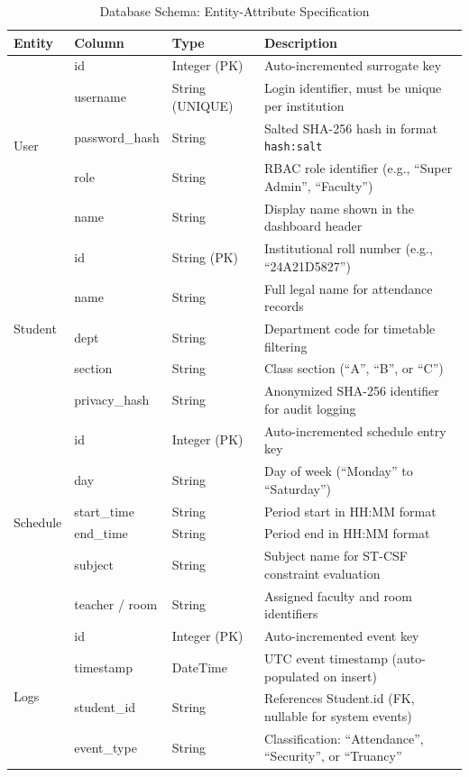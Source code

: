 \documentclass[12pt,a4paper,oneside]{report}
\begin{document}
\begin{table}[htbp]
\caption{Database Schema: Entity-Attribute Specification}
\centering
\small
{}
\setlength{\tabcolsep}{4pt}
\begin{tabular}{@{}l l l p{2.0in}@{}}
\hline
\textbf{Entity} & \textbf{Column} & \textbf{Type} & \textbf{Description} \\ \hline
\multirow{5}{*}{User} & id & Integer (PK) & Auto-incremented surrogate key \\
 & username & String (UNIQUE) & Login identifier, must be unique per institution \\
 & password\_hash & String & Salted SHA-256 hash in format \texttt{hash:salt} \\
 & role & String & RBAC role identifier (e.g., ``Super Admin'', ``Faculty'') \\
 & name & String & Display name shown in the dashboard header \\ \hline
\multirow{5}{*}{Student} & id & String (PK) & Institutional roll number (e.g., ``24A21D5827'') \\
 & name & String & Full legal name for attendance records \\
 & dept & String & Department code for timetable filtering \\
 & section & String & Class section (``A'', ``B'', or ``C'') \\
 & privacy\_hash & String & Anonymized SHA-256 identifier for audit logging \\ \hline
\multirow{6}{*}{Schedule} & id & Integer (PK) & Auto-incremented schedule entry key \\
 & day & String & Day of week (``Monday'' to ``Saturday'') \\
 & start\_time & String & Period start in HH:MM format \\
 & end\_time & String & Period end in HH:MM format \\
 & subject & String & Subject name for ST-CSF constraint evaluation \\
 & teacher / room & String & Assigned faculty and room identifiers \\ \hline
\multirow{4}{*}{Logs} & id & Integer (PK) & Auto-incremented event key \\
 & timestamp & DateTime & UTC event timestamp (auto-populated on insert) \\
 & student\_id & String & References Student.id (FK, nullable for system events) \\
 & event\_type & String & Classification: ``Attendance'', ``Security'', or ``Truancy'' \\ \hline
\end{tabular}
\label{tab:db_schema}
\end{table}
\end{document}
